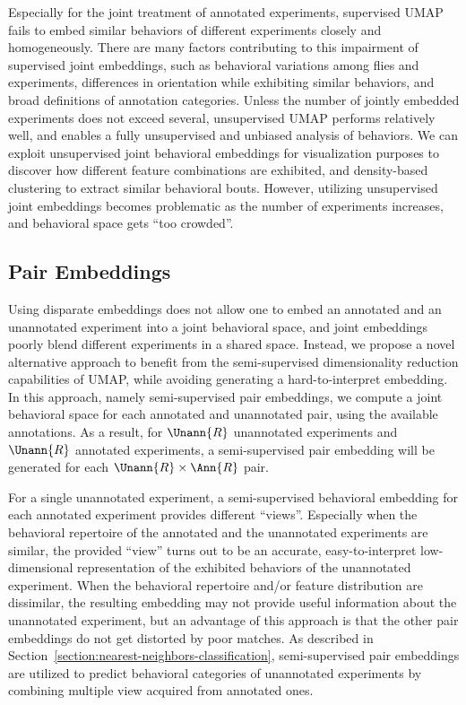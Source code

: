 Especially for the joint treatment of annotated experiments, supervised UMAP fails to embed similar behaviors of different experiments closely and homogeneously.
There are many factors contributing to this impairment of supervised joint embeddings, such as behavioral variations among flies and experiments,  differences in orientation while exhibiting similar behaviors, and broad definitions of annotation categories.
Unless the number of jointly embedded experiments does not exceed several, unsupervised UMAP performs relatively well, and enables a fully unsupervised and unbiased analysis of behaviors.
We can exploit unsupervised joint behavioral embeddings for visualization purposes to discover how different feature combinations are exhibited, and density-based clustering to extract similar behavioral bouts.
However, utilizing unsupervised joint embeddings becomes problematic as the number of experiments increases, and behavioral space gets ``too crowded''.

\subsection{Pair Embeddings}\label{section:pair-embeddings}
Using disparate embeddings does not allow one to embed an annotated and an unannotated experiment into a joint behavioral space, and joint embeddings poorly blend different experiments in a shared space.
Instead, we propose a novel alternative approach to benefit from the semi-supervised dimensionality reduction capabilities of UMAP, while avoiding generating a hard-to-interpret embedding.
In this approach, namely semi-supervised pair embeddings, we compute a joint behavioral space for each annotated and unannotated pair, using the available annotations.
As a result, for $\Unann{R}$ unannotated experiments and  $\Unann{R}$ annotated experiments, a semi-supervised pair embedding will be generated for each $\Unann{R} \times \Ann{R}$ pair.

For a single unannotated experiment, a semi-supervised behavioral embedding for each annotated experiment provides different ``views''.
Especially when the behavioral repertoire of the annotated and the unannotated experiments are similar, the provided ``view'' turns out to be an accurate, easy-to-interpret low-dimensional representation of the exhibited behaviors of the unannotated experiment.
When the behavioral repertoire and/or feature distribution are dissimilar, the resulting embedding may not provide useful information about the unannotated experiment, but an advantage of this approach is that the other pair embeddings do not get distorted by poor matches.
As described in Section~\ref{section:nearest-neighbors-classification}, semi-supervised pair embeddings are utilized to predict behavioral categories of unannotated experiments by combining multiple view acquired from annotated ones.

